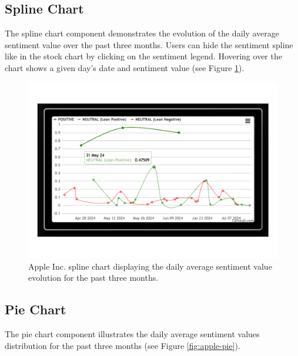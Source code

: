 \subsection{Spline Chart}
\label{subsec:spline-chart}
The spline chart component demonstrates the evolution of the daily average sentiment value over the past three months. Users can hide the sentiment spline like in the stock chart by clicking on the sentiment legend. Hovering over the chart shows a given day's date and sentiment value (see Figure \ref{fig:apple-stock-spline}).

\begin{figure}[htbp]
    \centering
    \includegraphics[width=\textwidth]{img/user/apple-spline-chart-a.pdf}
    \caption{Apple Inc. spline chart displaying the daily average sentiment value evolution for the past three months.}
    \label{fig:apple-stock-spline}
\end{figure}

\subsection{Pie Chart}
\label{subsec:pie-chart}
The pie chart component illustrates the daily average sentiment values distribution for the past three months (see Figure \ref{fig:apple-pie}).

